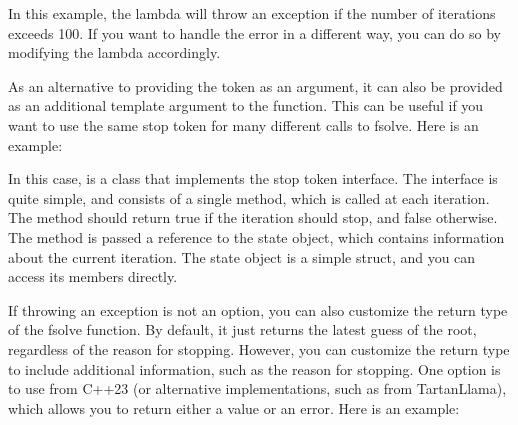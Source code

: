 \documentclass[letterpaper,10pt,english]{sphinxmanual}
\begin{document}
\sphinxAtStartPar
In this example, the lambda will throw an exception if the number of iterations exceeds 100. If you want to handle the error in a different way, you can do so by modifying the lambda accordingly.

\sphinxAtStartPar
As an alternative to providing the token as an argument, it can also be provided as an additional template argument to the  function. This can be useful if you want to use the same stop token for many different calls to fsolve. Here is an example:

\begin{sphinxVerbatim}[commandchars=\\\{\}]
\end{sphinxVerbatim}

\sphinxAtStartPar
In this case,  is a class that implements the stop token interface. The interface is quite simple, and consists of a single method, which is called at each iteration. The method should return true if the iteration should stop, and false otherwise. The method is passed a reference to the state object, which contains information about the current iteration. The state object is a simple struct, and you can access its members directly.

\sphinxAtStartPar
If throwing an exception is not an option, you can also customize the return type of the fsolve function. By default, it just returns the latest guess of the root, regardless of the reason for stopping. However, you can customize the return type to include additional information, such as the reason for stopping. One option is to use  from C++23 (or alternative implementations, such as  from TartanLlama), which allows you to return either a value or an error. Here is an example:
\end{document}

